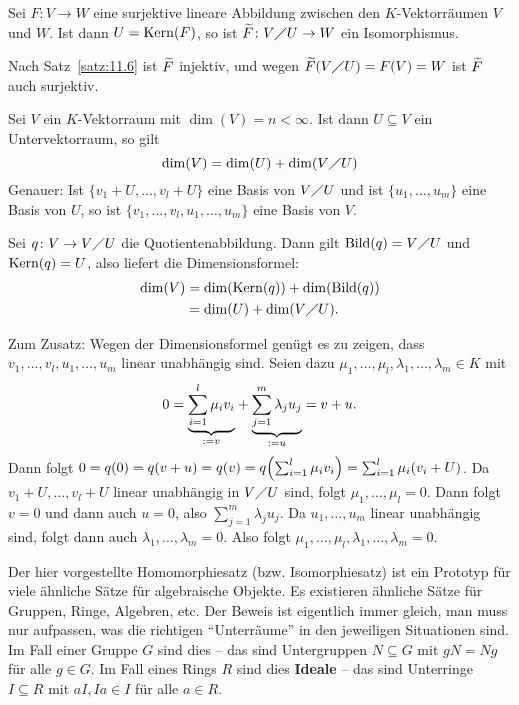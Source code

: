 \begin{korollar}[Isomorphiesatz]
	\label{kor:11.8}
	Sei $F\colon V \rightarrow W$ eine surjektive lineare Abbildung zwischen den $K$-Vektorräumen $V$ und $W$.
	Ist dann $U = \operatorname{Kern}(F)$, so ist $\widetilde{F} \colon V \diagup U \rightarrow W$ ein Isomorphismus. 
\end{korollar}

\begin{beweis}
	Nach Satz~\ref{satz:11.6} ist $\widetilde{F}$ injektiv, und wegen $\widetilde{F}(V \diagup U) = F(V) = W$ ist $\widetilde{F}$ auch surjektiv. 
\end{beweis}

\begin{satz}
	\label{satz:11.9}
	Sei $V$ ein $K$-Vektorraum mit $\dim(V) = n < \infty$.
	Ist dann $U \subseteq V$ ein Untervektorraum, so gilt
	\[
		\dim(V) = \dim(U) + \dim(V \diagup U)
	\]
	Genauer: Ist $\{v_1+U,\dots,v_l + U\}$ eine Basis von $V \diagup U$ und ist $\{u_1,\dots,u_m\}$ eine Basis von $U$, so ist $\{v_1,\dots,v_l,u_1,\dots,u_m\}$ eine Basis von $V$.
\end{satz}

\begin{beweis}
	Sei $q \colon V \rightarrow V \diagup U$ die Quotientenabbildung.
	Dann gilt $\operatorname{Bild}(q) = V \diagup U$ und $\operatorname{Kern}(q) = U$, also liefert die Dimensionsformel:
	\begin{align*}
		\dim(V) &= \dim(\operatorname{Kern}(q)) + \dim(\operatorname{Bild}(q)) \\
		&= \dim(U) + \dim(V\diagup U).
	\end{align*}
	 
	Zum Zusatz: Wegen der Dimensionsformel genügt es zu zeigen, dass $v_1,\dots,v_l,u_1,\dots,u_m$ linear unabhängig sind.
	Seien dazu $\mu_1,\dots,\mu_l,\lambda_1,\dots,\lambda_m \in K$ mit
	\[
		0 = {\underbrace{\sum_{i=1}^{l} \mu_i v_i}_{:= v}} + {\underbrace{\sum_{j=1}^{m} \lambda_j u_j}_{:= u}}  = v + u.
	\]
	Dann folgt $0 = q(0) = q(v+u) = q(v) = q \enb{\sum_{i=1}^{l} \mu_i v_i} = \sum_{i=1}^{l} \mu_i (v_i+U)$.
	Da $v_1+U, \dots, v_l+U$ linear unabhängig in $V \diagup U$ sind, folgt $\mu_1,\dots,\mu_l = 0$.
	Dann folgt $v = 0$ und dann auch $u = 0$, also $\sum_{j=1}^{m} \lambda_j u_j$.
	Da $u_1,\dots,u_m$ linear unabhängig sind, folgt dann auch $\lambda_1,\dots,\lambda_m = 0$.
	Also folgt $\mu_1,\dots,\mu_l,\lambda_1,\dots,\lambda_m = 0$. 
\end{beweis}

\begin{bemerkung}
	\label{bem:11.10}
	Der hier vorgestellte Homomorphiesatz (bzw. Isomorphiesatz) ist ein Prototyp für viele ähnliche Sätze für algebraische Objekte.
	Es existieren ähnliche Sätze für Gruppen, Ringe, Algebren, etc.
	Der Beweis ist eigentlich immer gleich, man muss nur aufpassen, was die richtigen \enquote{Unterräume} in den jeweiligen Situationen sind.
	Im Fall einer Gruppe $G$ sind dies  -- das sind Untergruppen $N \subseteq G$ mit $gN = Ng$ für alle $g \in G$.
	Im Fall eines Rings $R$ sind dies \textbf{Ideale} -- das sind Unterringe $I \subseteq R$ mit $aI, Ia \in I$ für alle $a \in R$. 
\end{bemerkung}

